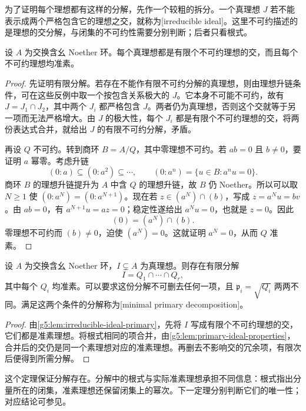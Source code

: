 为了证明每个理想都有这样的分解，先作一个较粗的拆分。一个真理想 \(J\) 若不能表示成两个严格包含它的理想之交，就称为[irreducible ideal]。这里不可约描述的是理想的交分解，与闭集的不可约性需要分别判断；后者只看根式。

\begin{lemma}\label{g5:lem:irreducible-ideal-primary}
	设 \(A\) 为交换含幺 Noether 环。每个真理想都是有限个不可约理想的交，而且每个不可约理想均准素。
\end{lemma}
\begin{proof}
	先证明有限分解。若存在不能作有限不可约分解的真理想，则由理想升链条件，可在这些反例中取一个按包含关系极大的 \(J\)。它本身不可能不可约，故有 \(J=J_1\cap J_2\)，其中两个 \(J_i\) 都严格包含 \(J\)。两者仍为真理想，否则这个交就等于另一项而无法严格增大。由 \(J\) 的极大性，每个 \(J_i\) 都是有限个不可约理想的交，将两份表达式合并，就给出 \(J\) 的有限不可约分解，矛盾。

	再设 \(Q\) 不可约。转到商环 \(B=A/Q\)，其中零理想不可约。若 \(ab=0\) 且 \(b\ne0\)，要证明 \(a\) 幂零。考虑升链
	\[
		(0:a)\subseteq(0:a^2)\subseteq\cdots,
		\qquad (0:a^n)=\{u\in B:a^nu=0\}.
	\]
	商环 \(B\) 的理想升链提升为 \(A\) 中含 \(Q\) 的理想升链，故 \(B\) 仍 Noether。所以可以取 \(N\ge1\) 使 \((0:a^N)=(0:a^{N+1})\)。现在若 \(z\in(a^N)\cap(b)\)，写成 \(z=a^Nu=bv\)。由 \(ab=0\)，有 \(a^{N+1}u=az=0\)；稳定性遂给出 \(a^Nu=0\)，也就是 \(z=0\)。因此
	\[
		(0)=(a^N)\cap(b).
	\]
	零理想不可约而 \((b)\ne0\)，迫使 \((a^N)=0\)。这就证明 \(a^N=0\)，从而 \(Q\) 准素。
\end{proof}

\begin{theorem}[准素分解定理]\label{g5:thm:primary-decomposition}
	设 \(A\) 为交换含幺 Noether 环，\(I\subsetneq A\) 为真理想。则存在有限分解
	\[
		I=Q_1\cap\cdots\cap Q_r,
	\]
	其中每个 \(Q_i\) 均准素。可以要求这份分解不可删去任何一项，且 \(\mathfrak p_i=\sqrt{Q_i}\) 两两不同。满足这两个条件的分解称为[minimal primary decomposition]。
\end{theorem}
\begin{proof}
	由\cref{g5:lem:irreducible-ideal-primary}，先将 \(I\) 写成有限个不可约理想的交，它们都是准素理想。将根式相同的项合并，由\cref{g5:lem:primary-ideal-properties}，合并后的交仍是同一个素理想对应的准素理想。再删去不影响交的冗余项，有限次后便得到所需分解。
\end{proof}

这个定理保证分解存在。分解中的根式与实际准素理想承担不同信息：根式指出分量所在的闭集，准素理想还保留闭集上的幂次。下一定理分别判断它们的唯一性；对应结论可参见\cite[第6节，定理6.8]{Matsumura1989}。


